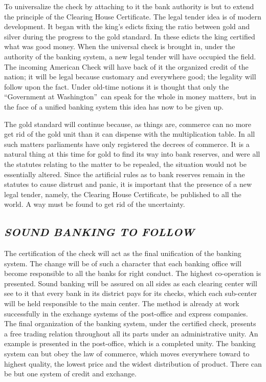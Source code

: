 \documentclass[openany,nobib]{tufte-book}
\begin{document}
To universalize the check by attaching to it the bank authority is but
to extend the principle of the Clearing House Certificate. The legal
tender idea is of modern development. It began with the king's edicts
fixing the ratio between gold and silver during the progress to the gold
standard. In these edicts the king certified what was good money. When
the universal check is brought in, under the authority of the banking
system, a new legal tender will have occupied the field. The incoming
American Check will have back of it the organized credit of the nation;
it will be legal because customary and everywhere good; the legality
will follow upon the fact. Under old-time notions it is thought that
only the ``Government at Washington''~can speak for the whole in money
matters, but in the face of a unified banking system this idea has now
to be given up.~

The gold standard will continue because, as things are, commerce can no
more get rid of the gold unit than it can dispense with the
multiplication table. In all such matters parliaments have only
registered the decrees of commerce. It is a natural thing at this time
for gold to find its way into bank reserves, and were all the statutes
relating to the matter to be repealed, the situation would not be
essentially altered. Since the artificial rules as to bank reserves
remain in the statutes to cause distrust and panic, it is important that
the presence of a new legal tender, namely, the Clearing House
Certificate, be published to all the world. A way must be found to get
rid of the uncertainty.~

\hypertarget{sound-banking-to-follow}{%
\subsection{\texorpdfstring{\emph{SOUND BANKING TO
FOLLOW}}{SOUND BANKING TO FOLLOW}}\label{sound-banking-to-follow}}

The certification of the check will act as the final unification of the
banking system. The change will be of such a character that each banking
office will become responsible to all the banks for right conduct. The
highest co-operation is presented. Sound banking will be assured on all
sides as each clearing center will see to it that every bank in its
district pays for its checks, which each sub-center will be held
responsible to the main center. The method is already at work
successfully in the exchange systems of the post-office and express
companies. The final organization of the banking system, under the
certified check, presents a free trading relation throughout all its
parts under an administrative unity. An example is presented in the
post-office, which is a completed unity. The banking system can but obey
the law of commerce, which moves everywhere toward to highest quality,
the lowest price and the widest distribution of product. There can be
but one system of credit and exchange. ~
\end{document}
